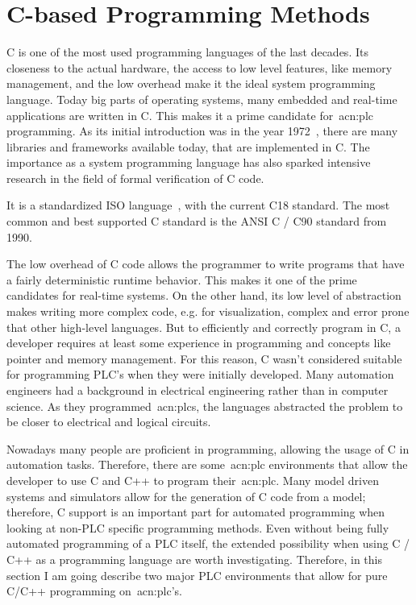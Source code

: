 \section{C-based Programming Methods}
\label{sec:c_methods}

C is one of the most used programming languages of the last decades.
Its closeness to the actual hardware, the access to low level features, like memory management, and the low overhead make it the ideal system programming language.
Today big parts of operating systems, many embedded and real-time applications are written in C.
This makes it a prime candidate for~\acrshort{acn:plc} programming.
As its initial introduction was in the year 1972~\cite{10.5555/576122}, there are many libraries and frameworks available today, that are implemented in C.
The importance as a system programming language has also sparked intensive research in the field of formal verification of C code.

It is a standardized ISO language~\cite{ISO:9899:2018}, with the current C18 standard.
The most common and best supported C standard is the ANSI C / C90 standard from 1990.

The low overhead of C code allows the programmer to write programs that have a fairly deterministic runtime behavior.
This makes it one of the prime candidates for real-time systems.
On the other hand, its low level of abstraction makes writing more complex code, e.g. for visualization, complex and error prone that other high-level languages.
But to efficiently and correctly program in C, a developer requires at least some experience in programming and concepts like pointer and memory management.
For this reason, C wasn't considered suitable for programming PLC's when they were initially developed.
Many automation engineers had a background in electrical engineering rather than in computer science.
As they programmed~\acrshort{acn:plc}s, the languages abstracted the problem to be closer to electrical and logical circuits.

Nowadays many people are proficient in programming, allowing the usage of C in automation tasks.
Therefore, there are some~\acrshort{acn:plc} environments that allow the developer to use C and C++ to program their~\acrshort{acn:plc}.
Many model driven systems and simulators allow for the generation of C code from a model; therefore, C support is an important part for automated programming when looking at non-PLC specific programming methods.
Even without being fully automated programming of a PLC itself, the extended possibility when using C / C++ as a programming language are worth investigating.
Therefore, in this section I am going describe two major PLC environments that allow for pure C/C++ programming on~\acrshort{acn:plc}'s.

